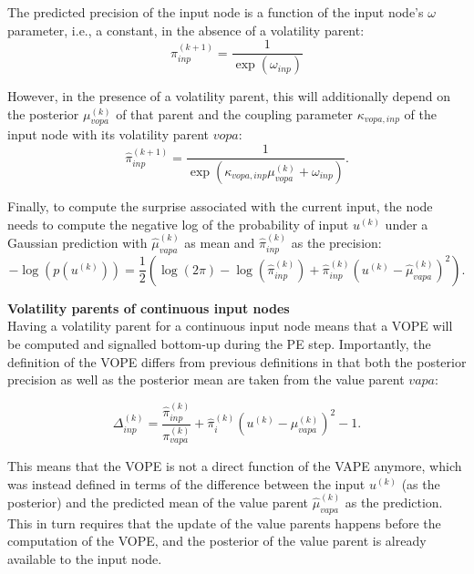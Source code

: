 The predicted precision of the input node is a function of the input node's $\omega$ parameter, i.e., a constant, in the absence of a volatility parent:
\begin{equation}
	\hat{\pi}_{inp}^{(k+1)} = \frac{1}{\exp(\omega_{inp})}
\end{equation}

However, in the presence of a volatility parent, this will additionally depend on the posterior $\mu_{vopa}^{(k)}$ of that parent and the coupling parameter $\kappa_{vopa,inp}$ of the input node with its volatility parent $vopa$:
\begin{equation}
	\hat{\pi}_{inp}^{(k+1)} = \frac{1}{\exp(\kappa_{vopa,inp} \mu_{vopa}^{(k)} + \omega_{inp})}.
\end{equation}

Finally, to compute the surprise associated with the current input, the node needs to compute the negative log of the probability of input $u^{(k)}$ under a Gaussian prediction with $\hat{\mu}_{vapa}^{(k)}$ as mean and $\hat{\pi}_{inp}^{(k)}$ as the precision:
\begin{equation}
	-\log(p(u^{(k)})) = \frac{1}{2} (\log(2\pi) - \log(\hat{\pi}_{inp}^{(k)}) + \hat{\pi}_{inp}^{(k)} (u^{(k)} - \hat{\mu}_{vapa}^{(k)})^2).
\end{equation}

\textbf{Volatility parents of continuous input nodes}\\
Having a volatility parent for a continuous input node means that a \textsf{VOPE} will be computed and signalled bottom-up during the \textsf{PE step}. Importantly, the definition of the \textsf{VOPE} differs from previous definitions in that both the posterior precision as well as the posterior mean are taken from the value parent $vapa$:

\begin{equation}
  \Delta_{inp}^{(k)} = \frac{\hat{\pi}_{inp}^{(k)}}{\pi_{vapa}^{(k)}} + \hat{\pi}_i^{(k)} (u^{(k)} - \mu_{vapa}^{(k)})^2 - 1. 
\end{equation}

This means that the \textsf{VOPE} is not a direct function of the \textsf{VAPE} anymore, which was instead defined in terms of the difference between the input $u^{(k)}$ (as the posterior) and the predicted mean of the value parent $\hat{\mu}_{vapa}^{(k)}$ as the prediction. This in turn requires that the update of the value parents happens before the computation of the \textsf{VOPE}, and the posterior of the value parent is already available to the input node.\\

